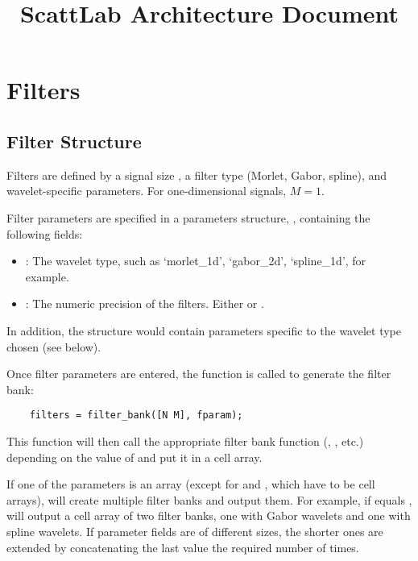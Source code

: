 \documentclass[twocolumn]{article}
\title{ScattLab Architecture Document}
\begin{document}
	
\maketitle

\section{Filters}

\subsection{Filter Structure}

Filters are defined by a signal size \mcode{[N,M]}, a filter type (Morlet, Gabor, spline), and wavelet-specific parameters. For one-dimensional signals, $M = 1$.

Filter parameters are specified in a parameters structure, , containing the following fields:
\begin{itemize}
	\item {}: The wavelet type, such as `morlet\_1d', `gabor\_2d', `spline\_1d', for example.
	\item {}: The numeric precision of the filters. Either  or .
\end{itemize}
In addition, the  structure would contain parameters specific to the wavelet type chosen (see below).

Once filter parameters are entered, the  function is called
to generate the filter bank:
\begin{lstlisting}
	filters = filter_bank([N M], fparam);
\end{lstlisting}
This function will then call the appropriate filter bank function (, , etc.) depending on the value of  and put it in a cell array. 

If one of the parameters is an array (except for  and , which have to be cell arrays),  will create multiple filter banks and output them. For example, if  equals ,  will output a cell array of two filter banks, one with Gabor wavelets and one with spline wavelets. If parameter fields are of different sizes, the shorter ones are extended by concatenating the last value the required number of times.
\end{document}
